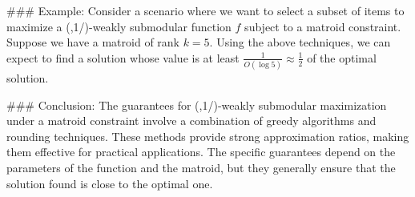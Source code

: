 ### Example:
Consider a scenario where we want to select a subset of items to maximize a (,1/)-weakly submodular function \( f \) subject to a matroid constraint. Suppose we have a matroid of rank \( k = 5 \). Using the above techniques, we can expect to find a solution whose value is at least \( \frac{1}{O(\log 5)} \approx \frac{1}{2} \) of the optimal solution.

### Conclusion:
The guarantees for (,1/)-weakly submodular maximization under a matroid constraint involve a combination of greedy algorithms and rounding techniques. These methods provide strong approximation ratios, making them effective for practical applications. The specific guarantees depend on the parameters of the function and the matroid, but they generally ensure that the solution found is close to the optimal one.